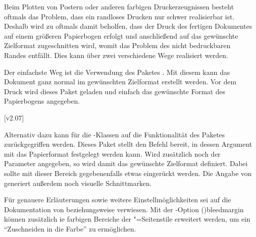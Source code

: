 %
Beim Plotten von Postern oder anderen farbigen Druckerzeugnissen besteht 
oftmals das Problem, dass ein randloses Drucken nur schwer realisierbar ist. 
Deshalb wird zu oftmals damit beholfen, dass der Druck des fertigen Dokumentes 
auf einem größeren Papierbogen erfolgt und anschließend auf das gewünschte 
Zielformat zugeschnitten wird, womit das Problem des nicht bedruckbaren Randes 
entfällt. Dies kann über zwei verschiedene Wege realisiert werden.

Der einfachste Weg ist die Verwendung des Paketes . Mit diesem 
kann das Dokument ganz normal im gewünschten Zielformat erstellt werden. Vor 
dem Druck wird dieses Paket geladen und einfach das gewünschte Format des 
Papierbogens angegeben. 
%
\begin{quoting}[rightmargin=0pt]
\end{quoting}
%
[v2.07]%
\begin{Entity}{}
Alternativ dazu kann für die \TUDScript-Klassen auf die Funktionalität des 
Paketes  zurückgegriffen werden. Dieses Paket stellt den 
Befehl
bereit, in dessen Argument mit
das Papierformat festgelegt werden kann. Wird zusätzlich noch der Parameter 
angegeben, so wird damit das gewünschte Zielformat definiert. Dabei sollte mit
dieser Bereich gegebenenfalls etwas eingerückt werden. Die Angabe von 
generiert außerdem noch visuelle Schnittmarken.
\end{Entity}
%
\begin{quoting}[rightmargin=0pt]
\end{quoting}
%
Für genauere Erläuterungen sowie weitere Einstellmöglichkeiten sei auf die 
Dokumentation von  beziehungsweise  verwiesen.
Mit der \TUDScript-Option \Option(){bleedmargin} können
zusätzlich ie farbigen Bereiche der "=Seitenstile 
erweitert werden, um ein \enquote{Zuschneiden in die Farbe} zu ermöglichen.



